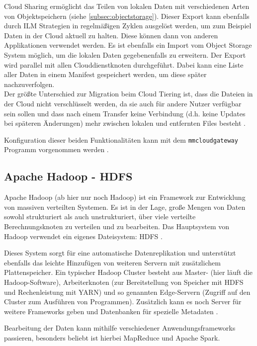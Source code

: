 Cloud Sharing ermöglicht das Teilen von lokalen Daten mit verschiedenen Arten von Objektspeichern (siehe \autoref{subsec:objectstorage}). Dieser Export kann ebenfalls durch \ac{ILM} Strategien in regelmäßigen Zyklen ausgelöst werden, um zum Beispiel Daten in der Cloud aktuell zu halten. Diese können dann von anderen Applikationen verwendet werden. Es ist ebenfalls ein Import vom Object Storage System möglich, um die lokalen Daten gegebenenfalls zu erweitern.
Der Export wird parallel mit allen Clouddienstknoten durchgeführt. Dabei kann eine Liste aller Daten in einem Manifest gespeichert werden, um diese später nachzuverfolgen.\\
Der größte Unterschied zur Migration beim Cloud Tiering ist, dass die Dateien in der Cloud nicht verschlüsselt werden, da sie auch für andere Nutzer verfügbar sein sollen und dass nach einem Transfer keine Verbindung (d.h. keine Updates bei späteren Änderungen) mehr zwischen lokalen und entfernten Files besteht \parencite[S. 109]{ibm.2017}.

Konfiguration dieser beiden Funktionalitäten kann mit dem \lstinline|mmcloudgateway| Programm vorgenommen werden \parencite{scale.2017}.

\subsection{Apache Hadoop - HDFS}

Apache Hadoop (ab hier nur noch Hadoop) ist ein Framework zur Entwicklung von massiven verteilten Systemen. Es ist in der Lage, große Mengen von Daten sowohl strukturiert als auch unstrukturiert, über viele verteilte Berechnungsknoten zu verteilen und zu bearbeiten. Das Hauptsystem von Hadoop verwendet ein eigenes Dateisystem: \ac{HDFS} \parencite[Kap. I,1]{alapati.2016}.

Dieses System sorgt für eine automatische Datenreplikation und unterstützt ebenfalls das leichte Hinzufügen von weiteren Servern mit zusätzlichem Plattenspeicher. Ein typischer Hadoop Cluster besteht aus Master- (hier läuft die Hadoop-Software), Arbeiterknoten (zur Bereitstellung von Speicher mit \ac{HDFS} und Rechenleistung mit \ac{YARN}) und so genannten Edge-Servern (Zugriff auf den Cluster zum Ausführen von Programmen). Zusätzlich kann es noch Server für weitere Frameworks geben und Datenbanken für spezielle Metadaten \parencite[Kap. I,1]{alapati.2016}.

Bearbeitung der Daten kann mithilfe verschiedener Anwendungsframeworks passieren, besonders beliebt ist hierbei MapReduce und Apache Spark.

